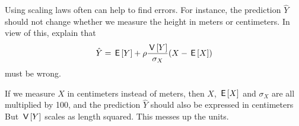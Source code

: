 \documentclass[lectures]{subfiles}
\begin{document}
\begin{exercise}
Using scaling laws often can help to find errors. For instance,  the prediction $\hat Y$ should not change whether we measure the height in meters or centimeters.
In view of this, explain that
\begin{align*}
  \hat Y = \,\mathsf{E}\left[Y\right] + \rho \frac{\,\mathsf{V}\left[Y\right]}{\sigma_X} (X - \,\mathsf{E}\left[X\right])
\end{align*}
must be wrong.
\begin{solution}
  If we measure $X$ in centimeters instead of meters, then $X$, $\,\mathsf{E}\left[X\right]$ and $\sigma_X$ are all multiplied by 100, and the prediction $\hat Y$ should also be expressed in centimeters But $\,\mathsf{V}\left[Y\right] $ scales as length squared.
  This messes up the units.
\end{solution}
\end{exercise}
\end{document}
